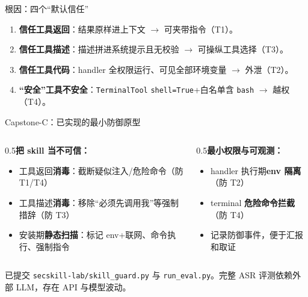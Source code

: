 \documentclass[aspectratio=169,10pt,fontset=fandol]{ctexbeamer}
\begin{document}
\begin{frame}{根因：四个“默认信任”}
  \begin{enumerate}[<+->]
    \item \textbf{信任工具返回}：结果原样进上下文 $\to$ 可夹带指令（T1）。
    \item \textbf{信任工具描述}：描述拼进系统提示且无校验 $\to$ 可操纵工具选择（T3）。
    \item \textbf{信任工具代码}：handler 全权限运行、可见全部环境变量 $\to$ 外泄（T2）。
    \item \textbf{“安全”工具不安全}：\texttt{TerminalTool} \texttt{shell=True}+白名单含 \texttt{bash} $\to$ 越权（T4）。
  \end{enumerate}
  \vfill{}
\end{frame}

\begin{frame}{Capstone-C：已实现的最小防御原型}
\begin{columns}
\begin{column}{0.5\textwidth}\textbf{把 skill 当不可信：}
  \begin{itemize}[<+->]
    \item 工具返回\textbf{消毒}：截断疑似注入/危险命令（防 T1/T4）
    \item 工具描述\textbf{消毒}：移除“必须先调用我”等强制措辞（防 T3）
    \item 安装期\textbf{静态扫描}：标记 env+联网、命令执行、强制指令
  \end{itemize}\end{column}
\begin{column}{0.5\textwidth}\textbf{最小权限与可观测：}
  \begin{itemize}[<+->]
    \item handler 执行期\textbf{env 隔离}（防 T2）
    \item terminal \textbf{危险命令拦截}（防 T4）
    \item 记录防御事件，便于汇报和取证
  \end{itemize}\end{column}
\end{columns}
\vfill\centering\footnotesize 已提交 \texttt{secskill-lab/skill\_guard.py} 与 \texttt{run\_eval.py}。完整 ASR 评测依赖外部 LLM，存在 API 与模型波动。
\end{frame}
\end{document}
